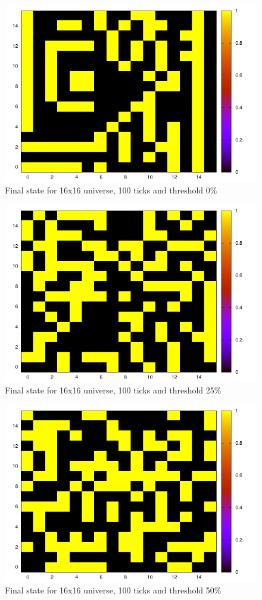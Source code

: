 \documentclass[11pt]{article}
\numberwithin{figure}{section}
\begin{document}
\begin{figure}[t]
\centering
   \includegraphics{gol-16-100-0.pdf}
\caption{Final state for 16x16 universe, 100 ticks and threshold 0\%}
\label{fig:0}
\end{figure}
\begin{figure}[t]
\centering
   \includegraphics{gol-16-100-25.pdf}
\caption{Final state for 16x16 universe, 100 ticks and threshold 25\%}
\label{fig:25}
\end{figure}
\begin{figure}[t]
\centering
   \includegraphics{gol-16-100-50.pdf}
\caption{Final state for 16x16 universe, 100 ticks and threshold 50\%}
\label{fig:50}
\end{figure}
\end{document}
